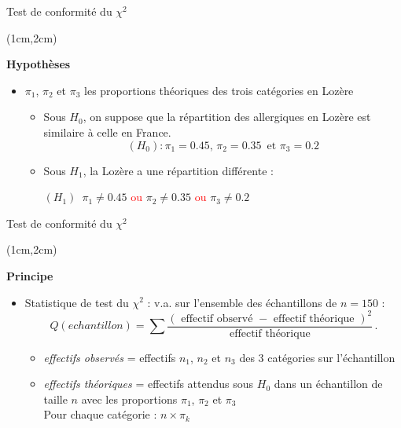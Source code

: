 \documentclass{beamer}
\begin{document}
\begin{frame}{Test de conformité du $\chi^2$}
\begin{textblock*}{\textwidth}(1cm,2cm)

\begin{center}{\bf \Large Hypothèses} \end{center}

\begin{itemize}
\item  $\pi_1$, $\pi_2$ et $\pi_3$ les proportions théoriques des trois catégories en Lozère
\begin{itemize}
\item Sous $H_0$, on suppose que la répartition des allergiques en Lozère est similaire à celle en France. 
$$(H_0) : \pi_1=0.45, \, \pi_2=0.35 \, {\mbox { et }}  \pi_3=0.2$$

\item Sous $H_1$, la Lozère a une répartition différente : \\
\begin{center}
$(H_1)\,$ $\pi_1\neq 0.45$ \textcolor{red}{ou} $\pi_2\neq 0.35$ \textcolor{red}{ou}  $\pi_3\neq 0.2$
\end{center}
\end{itemize}
\end{itemize}

\end{textblock*}

\end{frame}


\begin{frame}{Test de conformité du $\chi^2$}
\begin{textblock*}{\textwidth}(1cm,2cm)

\begin{center}{\bf \Large Principe} \end{center}

\begin{itemize}
\item Statistique de test du $\chi^2$ : v.a. sur l'ensemble des échantillons de $n=150$ :
$$
Q(echantillon)=\sum\frac{ ({\mbox { effectif observé }} -  {\mbox { effectif théorique }})^2}
 { {\mbox { effectif théorique }}} \,.
$$
\begin{itemize}
\item {\it effectifs observés} =  effectifs $n_1$, $n_2$ et $n_3$ des 3 catégories sur l'échantillon 

\item {\it effectifs théoriques} =  effectifs attendus sous $H_0$ dans un échantillon de taille $n$ avec les proportions $\pi_1$, $\pi_2$ et $\pi_3$ \\
Pour chaque catégorie : $ n \times \pi_k$
\end{itemize}
\end{itemize}

\end{textblock*}

\end{frame}
\end{document}
